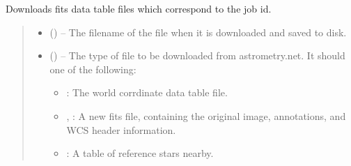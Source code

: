 \documentclass[letterpaper,11pt,english]{sphinxmanual}
\begin{document}
\begin{savenotes}
\begin{fulllineitems}
\begin{savenotes}
\begin{fulllineitems}
\end{fulllineitems}\end{savenotes}


\begin{savenotes}\begin{fulllineitems}
\label{\detokenize{code/opihiexarata.astrometry.webclient:opihiexarata.astrometry.webclient.AstrometryNetWebAPIEngine.download_result_file}}
\pysigstartsignatures
{}
\pysigstopsignatures
\sphinxAtStartPar
Downloads fits data table files which correspond to the job id.
\begin{quote}\begin{description}
\begin{itemize}
\item {} 
\sphinxAtStartPar
{} () – The filename of the file when it is downloaded and saved to disk.

\item {} 
\sphinxAtStartPar
{} () – 
\sphinxAtStartPar
The type of file to be downloaded from astrometry.net. It should
one of the following:
\begin{itemize}
\item {} 
\sphinxAtStartPar
{}: The world corrdinate data table file.

\item {} 
\sphinxAtStartPar
{}, : A new fits file, containing the
original image, annotations, and WCS header information.

\item {} 
\sphinxAtStartPar
{}: A table of reference stars nearby.


\end{itemize}
\end{itemize}
\end{description}
\end{quote}
\end{fulllineitems}
\end{savenotes}
\end{fulllineitems}
\end{savenotes}
\end{document}
